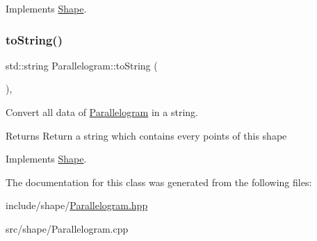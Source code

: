 Implements \hyperlink{classShape_a2dea8616fd40f2d69fd208715921982a}{Shape}.

\mbox{\label{classParallelogram_a9caae0044f23d8a1e87b1a78d852c37f}} 
\subsubsection{\texorpdfstring{to\+String()}{toString()}}
{\footnotesize\ttfamily std\+::string Parallelogram\+::to\+String (\begin{DoxyParamCaption}{ }\end{DoxyParamCaption})\hspace{0.3cm}{\ttfamily [override]}, {\ttfamily [virtual]}}



Convert all data of \hyperlink{classParallelogram}{Parallelogram} in a string. 

\begin{DoxyReturn}{Returns}
Return a string which contains every points of this shape 
\end{DoxyReturn}


Implements \hyperlink{classShape_a98fa87c6dc4c7045fd6897a8f3bc186c}{Shape}.



The documentation for this class was generated from the following files\+:\begin{DoxyCompactItemize}
\item 
include/shape/\hyperlink{Parallelogram_8hpp}{Parallelogram.\+hpp}\item 
src/shape/Parallelogram.\+cpp\end{DoxyCompactItemize}
